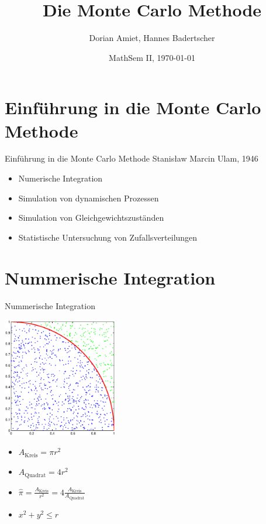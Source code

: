 \documentclass{beamer}
\title{Die Monte Carlo Methode}
\author[Amiet, Badertscher]{Dorian Amiet, Hannes Badertscher}
\date [MathSem II, FS14]{MathSem II, \today}
\begin{document}
\begin{frame}
	\titlepage
\end{frame}
	
\section[Einführung]{Einführung in die Monte Carlo Methode}
\begin{frame}{Einführung in die Monte Carlo Methode}
	Stanisław Marcin Ulam, 1946 
	\begin{itemize}
	\item<1-> Numerische Integration
	\item<1-> Simulation von dynamischen Prozessen
	\item<1-> Simulation von Gleichgewichtszuständen
	\item<1-> Statistische Untersuchung von Zufallsverteilungen
	\end{itemize}
\end{frame}

\section{Nummerische Integration}
\begin{frame}{Nummerische Integration}

	\begin{minipage}{5cm}
		\includegraphics[width=5cm]{images/kreis_hitmiss.eps}
	\end{minipage}
	\begin{minipage}{5cm}
		\begin{itemize}
		\item<1-> $A_{\text{Kreis}} = \pi r^{2}$
		\item<1-> $A_{\text{Quadrat}} = 4r^2$
		\item<1-> $\hat{\pi} = \frac{A_{\text{Kreis}}}{r^2} = 4 \frac{A_{\text{Kreis}}}{A_{\text{Quadrat}}}$
		\item<1-> $x^2 + y^2 \leq r$
		\end{itemize}
	\end{minipage}
\end{frame}
\end{document}
